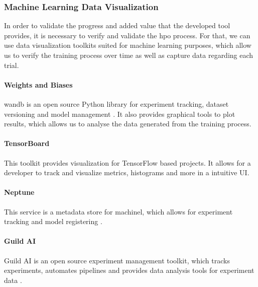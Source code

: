
\subsubsection{Machine Learning Data Visualization}

In order to validate the progress and added value that the developed tool provides, it is necessary to verify and validate the \acrshort{hpo} process. For that, we can use data visualization toolkits suited for machine learning purposes, which allow us to verify the training process over time as well as capture data regarding each trial. 

\paragraph{Weights and Biases}

wandb is an open source Python library for experiment tracking, dataset versioning and model management \parencite{wandb}. It also provides graphical tools to plot results, which allows us to analyse the data generated from the training process.

\paragraph{TensorBoard}

This toolkit provides visualization for TensorFlow \parencite{Tensorflow} based projects. It allows for a developer to track and visualize metrics, histograms and more in a intuitive UI.

\paragraph{Neptune}

This service is a metadata store for \acrshort{machinel}, which allows for experiment tracking and model registering \parencite{neptune}.

\paragraph{Guild AI}

Guild AI is an open source experiment management toolkit, which tracks experiments, automates pipelines and provides data analysis tools for experiment data \parencite{guildai}.

